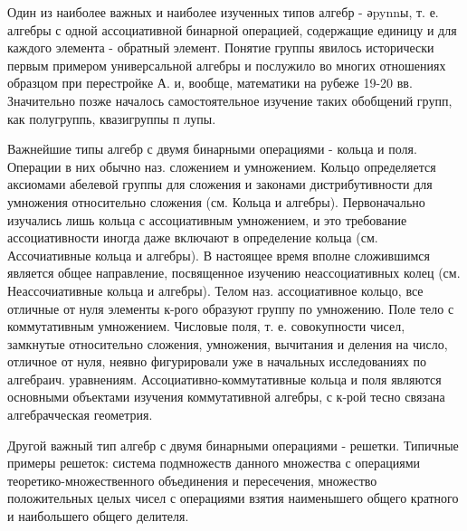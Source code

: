 \documentclass[10pt]{article}
\begin{document}
Один из наиболее важных и наиболее изученных типов алгебр - әpynnы, т. е. алгебры с одной ассоциативной бинарной операцией, содержащие единицу и для каждого элемента - обратный элемент. Понятие группы явилось исторически первым примером универсальной алгебры и послужило во многих отношениях образцом при перестройке А. и, вообще, математики на рубеже 19-20 вв. Значительно позже началось самостоятельное изучение таких обобщений групп, как полугруппь, квазигруппы п лупы.



Важнейшие типы алгебр с двумя бинарными операциями - кольца и поля. Операции в них обычно наз. сложением и умножением. Кольцо определяется аксиомами абелевой группы для сложения и законами дистрибутивности для умножения относительно сложения (см. Кольца и алгебры). Первоначально изучались лишь кольца с ассоциативным умножением, и это требование ассоциативности иногда даже включают в определение кольца (см. Ассочиативные кольца $и$ алгебры). В настоящее время вполне сложившимся является общее направление, посвященное изучению неассоциативных колец (см. Неассочиативные кольца и алгебры). Телом наз. ассоциативное кольцо, все отличные от нуля элементы к-рого образуют группу по умножению. Поле тело с коммутативным умножением. Числовые поля, т. е. совокупности чисел, замкнутые относительно сложения, умножения, вычитания и деления на число, отличное от нуля, неявно фигурировали уже в начальных исследованиях по алгебраич. уравнениям. Ассоциативно-коммутативные кольца и поля являются основными объектами изучения коммутативной алгебры, с к-рой тесно связана алгебрачческая геометрия.



Другой важный тип алгебр с двумя бинарными операциями - решетки. Типичные примеры решеток: система подмножеств данного множества с операциями теоретико-множественного объединения и пересечения, множество положительных целых чисел с операциями взятия наименышего общего кратного и наибольшего общего делителя.
\end{document}
